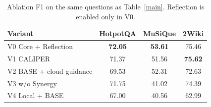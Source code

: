 \begin{table}[pos=!htb]
\caption{Answer F1 with fully relevant evidence on 7,405/2,410/12,576 questions (HotpotQA/MuSiQue/2Wiki). All methods use the same questions.}
\label{inf}
\centering
\small
{}
\end{table}

\begin{table}[pos=!htb]
\caption{Ablation F1 on the same questions as Table~\ref{main}. Reflection is enabled only in V0.}
\label{ablation}
\centering
\fontsize{8}{10}\selectfont
\setlength{\tabcolsep}{3pt}
\begin{tabular}{lccc}
\toprule
\textbf{Variant} & \textbf{HotpotQA} & \textbf{MuSiQue} & \textbf{2Wiki} \\
\midrule
V0 Core + Reflection & \textbf{72.05} & \textbf{53.61} & 75.46 \\
V1 CALIPER & 71.37 & 51.56 & \textbf{75.62} \\
V2 BASE + cloud guidance & 69.53 & 52.31 & 72.63 \\
V3 w/o Synergy & 71.75 & 41.02 & 74.39 \\
V4 Local + BASE & 67.00 & 40.56 & 62.99 \\
\bottomrule
\end{tabular}
\end{table}

